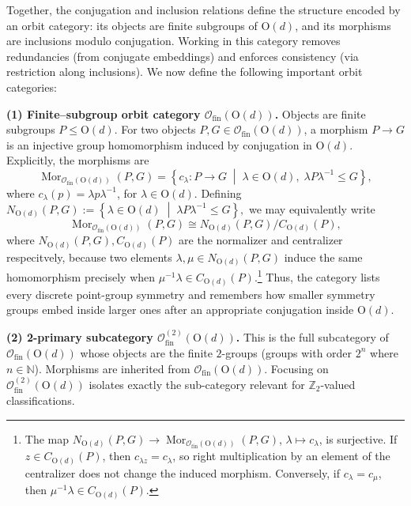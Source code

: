 \documentclass[aps,prx,reprint,superscriptaddress,twocolumn,amsmath,amssymb,amsfonts, nofootinbib]{revtex4-2}
\newcommand{\ofin}{\mathcal{O}_{\text{fin}}}
\theoremstyle{apsstyle}
\begin{document}
Together, the conjugation and inclusion relations define the structure encoded by an orbit category: its objects are finite subgroups of $\mathrm{O}(d)$, and its morphisms are inclusions modulo conjugation. Working in this category removes redundancies (from conjugate embeddings) and enforces consistency (via restriction along inclusions). We now define the following important orbit categories:

\medskip
\noindent\textbf{(1) Finite–subgroup orbit category $\ofin(\mathrm{O}(d))$.}
Objects are finite subgroups $P\le \mathrm{O}(d)$. For two objects $P,G\in\ofin(\mathrm{O}(d))$, a morphism $P\to G$ is an injective group homomorphism induced by conjugation in $\mathrm{O}(d)$. Explicitly, the morphisms are
\begin{equation*}
\operatorname{Mor}_{\ofin(\mathrm{O}(d))}(P,G)
=
\left\{
c_\lambda:P\to G
\;\middle|\;
\lambda\in \mathrm{O}(d),\;
\lambda P\lambda^{-1}\leq G
\right\},
\end{equation*}
where $c_\lambda(p)=\lambda p\lambda^{-1}$, for $\lambda\in \mathrm{O}(d)$. Defining $N_{\mathrm{O}(d)}(P,G) := \left\{ \lambda\in \mathrm{O}(d) \;\middle|\; \lambda P\lambda^{-1}\leq G \right\}, $ we may equivalently write 
\begin{equation*} 
\operatorname{Mor}_{\ofin(\mathrm{O}(d))}(P,G) \cong N_{\mathrm{O}(d)}(P,G)/C_{\mathrm{O}(d)}(P), 
\end{equation*}
where $N_{\mathrm{O}(d)}(P,G), C_{\mathrm{O}(d)}(P)$ are the normalizer and centralizer respecitvely, because two elements $\lambda,\mu\in N_{\mathrm{O}(d)}(P,G)$ induce the same homomorphism precisely when $\mu^{-1}\lambda\in C_{\mathrm{O}(d)}(P)$.\footnote{The map
$N_{\mathrm{O}(d)}(P,G)\to \operatorname{Mor}_{\ofin(\mathrm{O}(d))}(P,G)$,
$\lambda\mapsto c_\lambda$, is surjective. If
$z\in C_{\mathrm{O}(d)}(P)$, then $c_{\lambda z}=c_\lambda$, so right multiplication
by an element of the centralizer does not change the induced morphism.
Conversely, if $c_\lambda=c_\mu$, then
$\mu^{-1}\lambda\in C_{\mathrm{O}(d)}(P)$.} Thus, the category lists every discrete point-group symmetry and remembers how smaller symmetry groups embed inside larger ones after an appropriate conjugation inside $\mathrm{O}(d)$.

\medskip
\noindent\textbf{(2) 2-primary subcategory $\ofin^{(2)}(\mathrm{O}(d))$.}
This is the full subcategory of $\ofin(\mathrm{O}(d))$ whose objects are the finite $2$-groups (groups with order $2^{n}$ where $n\in \mathbb{N}$).
Morphisms are inherited from $\ofin(\mathrm{O}(d))$.
Focusing on $\ofin^{(2)}(\mathrm{O}(d))$ isolates exactly the sub-category relevant for $\mathbb{Z}_{2}$-valued classifications.
\end{document}
